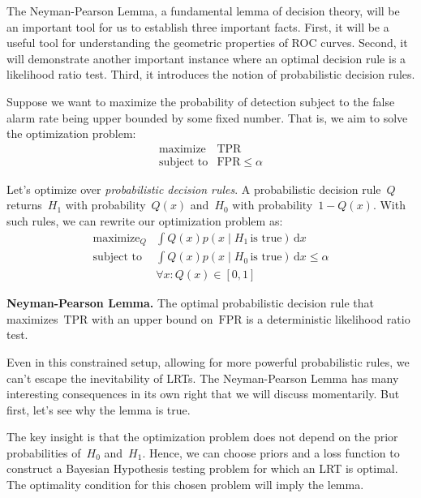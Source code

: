 \documentclass{tufte-book}
\begin{document}
The Neyman-Pearson Lemma, a fundamental lemma of decision theory, will
be an important tool for us to establish three important facts. First,
it will be a useful tool for understanding the geometric properties of
ROC curves. Second, it will demonstrate another important instance where
an optimal decision rule is a likelihood ratio test. Third, it
introduces the notion of probabilistic decision
rules.

Suppose we want to maximize the probability of detection subject to the
false alarm rate being upper bounded by some fixed number. That is, we
aim to solve the optimization problem: \[
\begin{array}{ll}
    \text{maximize} & \mathrm{TPR}\\
    \text{subject to} & \mathrm{FPR} \leq \alpha
\end{array}
\]

Let's optimize over \emph{probabilistic decision rules}. A probabilistic
decision rule~\(Q\) returns~\(H_1\) with probability~\(Q(x)\)
and~\(H_0\) with probability~\(1-Q(x)\). With such rules, we can rewrite
our optimization problem as: \[
\begin{array}{ll}
    \text{maximize}_Q & \int Q(x) p(x\mid H_1\,\text{is true}) \,\mathrm{d} x\\
    \text{subject to} & \int Q(x) p(x\mid H_0\,\text{is true}) \,\mathrm{d} x \leq \alpha\\
       & \forall x\colon Q(x) \in [0,1]
\end{array}
\]

\begin{Lemma}

\textbf{Neyman-Pearson Lemma.} The optimal probabilistic decision rule
that maximizes~\(\mathrm{TPR}\) with an upper bound on~\(\mathrm{FPR}\)
is a deterministic likelihood ratio test.

\end{Lemma}

Even in this constrained setup, allowing for more powerful probabilistic
rules, we can't escape the inevitability of LRTs. The Neyman-Pearson
Lemma has many interesting consequences in its own right that we will
discuss momentarily. But first, let's see why the lemma is true.

The key insight is that the optimization problem does not depend on the
prior probabilities of~\(H_0\) and~\(H_1\). Hence, we can choose priors
and a loss function to construct a Bayesian Hypothesis testing problem
for which an LRT is optimal. The optimality condition for this chosen
problem will imply the lemma.
\end{document}
